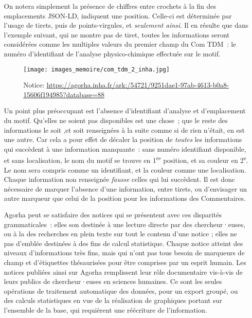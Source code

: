 \documentclass[a4paper,12pt, twoside]{book}
\begin{document}
On notera simplement la présence de chiffres entre crochets à la fin des emplacements JSON-LD, indiquent une position. Celle-ci est déterminée par l’usage de tirets, puis de points-virgules, et \textit{seulement ainsi}. Il en résulte que dans l’exemple suivant, qui ne montre pas de tiret, toutes les informations seront considérées comme les multiples valeurs du premier champ du \textsf{Com TDM}~: le numéro d’identifiant de l’analyse physico-chimique effectuée sur le motif.

\begin{figure}[!h]
    \centering
    \texttt{[image: images\_memoire/com\_tdm\_2\_inha.jpg]}
    \caption*{Notice: \url{https://agorha.inha.fr/ark:/54721/9251dae1-97ab-4613-b0a8-15606f194985?database=88}}
    \label{Un autre couac.}
\end{figure}

Un point plus préoccupant est l’absence d’identifiant d’analyse et d’emplacement du motif. Qu’elles ne soient pas disponibles est une chose~; que le reste des informations le soit ,et soit renseignées à la suite comme si de rien n’était, en est une autre. Car cela a pour effet de décaler la position de \textit{toutes} les informations qui succèdent à une information manquante~: sans numéro identifiant disponible, et sans localisation, le nom du motif se trouve en 1\textsuperscript{re} position, et sa couleur en 2\textsuperscript{e}. Le nom sera compris comme un identifiant, et la couleur comme une localisation. Chaque information non renseignée \textit{fausse} celles qui lui succèdent. Il est donc nécessaire de marquer l’absence d’une information, entre tirets, ou d’envisager un autre marqueur que celui de la position pour les informations des \textsf{Commentaires}.

Agorha peut se satisfaire des notices qui se présentent avec ces disparités grammaticales~: elles son destinée à une lecture directe par des chercheur·euses, ou à la des recherches en plein texte sur tout le contenu d’une notice ; elles ne pas d’emblée destinées à des fins de calcul statistique. Chaque notice atteint des niveaux d’informations très fins, mais qui n’ont pas tous besoin de marqueurs de champ et d’étiquettes thésaurisées pour être comprises par un esprit humain. Les notices publiées ainsi sur Agorha remplissent leur rôle documentaire vis-à-vis de leurs publics de chercheur·euses en sciences humaines. Ce sont les seules opérations de traitement automatique des données, pour un export groupé, ou des calculs statistiques en vue de la réalisation de graphiques portant sur l’ensemble de la base, qui requièrent une réécriture de l’information.
\end{document}
